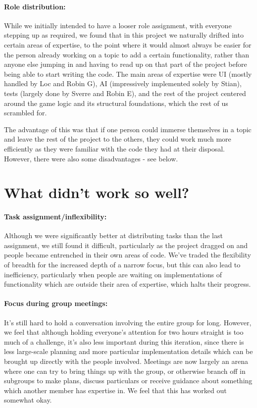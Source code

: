 \documentclass{article}
\begin{document}
\paragraph{Role distribution:} While we initially intended to have a looser role assignment, with everyone stepping up as required, we found that in this project we naturally drifted into certain areas of expertise, to the point where it would almost always be easier for the person already working on a topic to add a certain functionality, rather than anyone else jumping in and having to read up on that part of the project before being able to start writing the code. The main areas of expertise were UI (mostly handled by Loc and Robin G), AI (impressively implemented solely by Stian), tests (largely done by Sverre and Robin E), and the rest of the project centered around the game logic and its structural foundations, which the rest of us scrambled for.

The advantage of this was that if one person could immerse themselves in a topic and leave the rest of the project to the others, they could work much more efficiently as they were familiar with the code they had at their disposal. However, there were also some disadvantages - see below.

\section*{What didn't work so well?}

\paragraph{Task assignment/inflexibility:} Although we were significantly better at distributing tasks than the last assignment, we still found it difficult, particularly as the project dragged on and people became entrenched in their own areas of code. We've traded the flexibility of breadth for the increased depth of a narrow focus, but this can also lead to inefficiency, particularly when people are waiting on implementations of functionality which are outside their area of expertise, which halts their progress.

\paragraph{Focus during group meetings:} It's still hard to hold a conversation involving the entire group for long. However, we feel that although holding everyone's attention for two hours straight is too much of a challenge, it's also less important during this iteration, since there is less large-scale planning and more particular implementation details which can be brought up directly with the people involved. Meetings are now largely an arena where one can try to bring things up with the group, or otherwise branch off in subgroups to make plans, discuss particulars or receive guidance about something which another member has expertise in. We feel that this has worked out somewhat okay.
\end{document}
